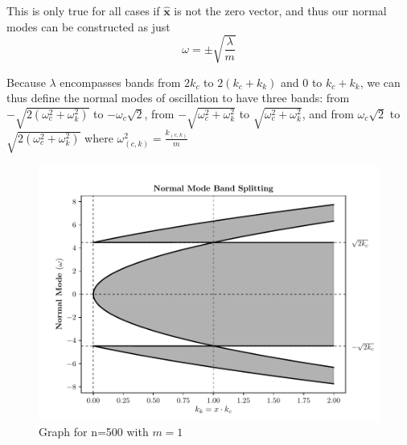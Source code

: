 \documentclass[11pt]{article}
\begin{document}
This is only true for all cases if $\mathbf{\hat{x}}$ is not the zero vector, and thus our normal modes can be constructed as just
\[
\omega = \pm \sqrt{\frac{\lambda}{m}}
\]

Because $\lambda$ encompasses bands from $2k_c$ to $2(k_c + k_k)$ and $0$ to $k_c + k_k$, we can thus define the normal modes of oscillation to have three bands: from $-\sqrt{2( \omega_c^2 + \omega_k^2 )}$ to $- \omega_c \sqrt{2}$, from $-\sqrt{\omega_c^2 + \omega_k^2}$ to $\sqrt{ \omega_c^2 + \omega_k^2}$, and from $\omega_c \sqrt{2}$ to $\sqrt{2 ( \omega_c^2 + \omega_k^2 )}$ where $\omega_{(c,k)}^2 = \frac{k_{(c,k)}}{m}$

\begin{figure}[H]
	\centering
	\includegraphics[scale=0.7]{bandSplitting.pdf}
	\caption{Graph for n=500 with $m = 1$}
\end{figure}
\end{document}
